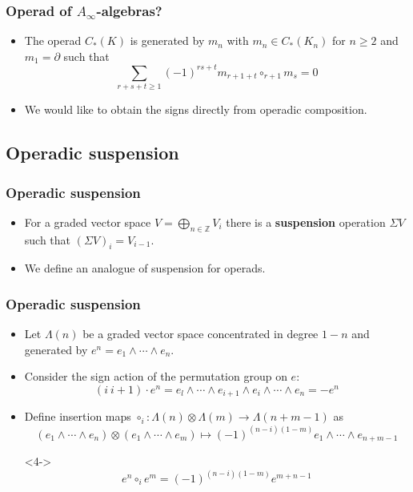 \documentclass{beamer}
\theoremstyle{definition}
\newcommand{\Z}{\mathbb{Z}}
\begin{document}
\begin{frame}
\frametitle{Operad of $A_\infty$-algebras?}
\begin{itemize}
\item<1-> The operad $C_*(K)$ is generated by $m_n$ with $m_n\in C_*(K_n)$ for $n\geq 2$ and $m_1=\partial$ such that 
\[\sum_{r+s+t\geq 1}(-1)^{rs+t}m_{r+1+t}\circ_{r+1}m_s=0\]

\item<2-> We would like to obtain the signs directly from operadic composition.
\end{itemize}
\end{frame}
\subsection{Operadic suspension}
\begin{frame}
\frametitle{Operadic suspension}
\begin{itemize}
\item<1-> For a graded vector space $V=\bigoplus_{n\in\Z} V_i$ there is a \textbf{suspension} operation $\Sigma V$ such that $(\Sigma V)_i=V_{i-1}$. %
\item<2-> We define an analogue of suspension for operads.
\end{itemize}
\end{frame}
\begin{frame}
\frametitle{Operadic suspension}
\begin{itemize}
\item<1-> Let $\Lambda(n)$ be a graded vector space concentrated in degree $1-n$ and generated by $e^n=e_1\land\cdots\land e_n$.
\item<2-> Consider the sign action of the permutation group on $e$:
\[(i\ i+1)\cdot e^n=e_l\land\cdots\land e_{i+1}\land e_i\land\cdots\land e_n=-e^n\]
\item<3-> Define insertion maps $\circ_i:\Lambda(n)\otimes\Lambda(m)\to\Lambda(n+m-1)$ as
\[(e_1\land\cdots\land e_n)\otimes(e_1\land\cdots\land e_m)\mapsto  (-1)^{(n-i)(1-m)}e_1\land\cdots\land e_{n+m-1}\]
\item[]<4-> \[e^n\circ_i e^m= (-1)^{(n-i)(1-m)}e^{m+n-1}\]
\end{itemize}
\end{frame}
\end{document}
